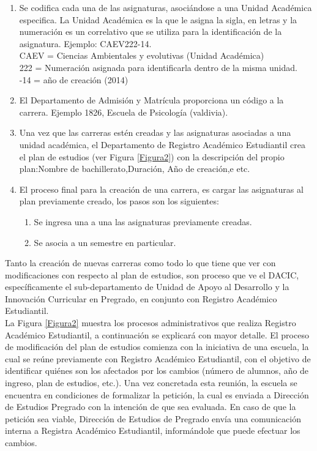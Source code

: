 		
		\begin{enumerate}
			
			
			\item Se codifica cada una de las asignaturas, asociándose a una Unidad Académica especifica. La Unidad Académica es la que le asigna la sigla, en letras y la numeración es un correlativo que se utiliza para la identificación de la asignatura. Ejemplo: CAEV222-14.
			\\
			CAEV = Ciencias Ambientales y evolutivas (Unidad Académica)
			\\
			222   = Numeración asignada para identificarla dentro de la misma unidad.
			\\
			-14    = año de creación (2014)
			
			\item El Departamento de Admisión y Matrícula proporciona  un código a la carrera. Ejemplo 1826, Escuela de Psicología (valdivia).
			
			\item Una vez que las carreras estén creadas y las asignaturas asociadas a una unidad académica, el Departamento de Registro Académico Estudiantil crea el plan de estudios (ver Figura \ref{Figura2}) con la descripción del propio plan:Nombre de bachillerato,Duración, Año de creación,e etc.
			
			\item El proceso final para la creación de una carrera, es cargar  las asignaturas al plan previamente creado, los pasos son los siguientes:
			\begin{enumerate}
				\item Se ingresa una a una las asignaturas previamente creadas.
				\item Se asocia a un semestre en particular.
			\end{enumerate}
		\end{enumerate}

		
		Tanto la creación de nuevas carreras como todo lo que tiene que ver con modificaciones con respecto al plan de estudios, son proceso que ve el DACIC, específicamente el sub-departamento de Unidad de Apoyo al Desarrollo y la Innovación Curricular en Pregrado, en conjunto con Registro Académico Estudiantil.
		\\
		
		La Figura \ref{Figura2} muestra los procesos administrativos que realiza Registro Académico Estudiantil, a continuación se explicará con mayor detalle.
		El proceso de modificación del plan de estudios comienza con la iniciativa de una escuela, la cual se reúne previamente con Registro Académico Estudiantil, con el objetivo  de identificar quiénes son los afectados por los cambios (número de alumnos, año de ingreso, plan de estudios, etc.). Una vez concretada esta reunión, la escuela se encuentra en condiciones de formalizar la petición, la cual es enviada a Dirección de Estudios Pregrado con la intención de que sea evaluada. En caso de que la petición sea viable, Dirección de Estudios de Pregrado envía una comunicación interna a Registra Académico Estudiantil, informándole que puede efectuar los cambios.
		\\
		
